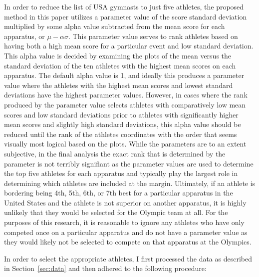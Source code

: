 \documentclass[12pt]{article}
\begin{document}
In order to reduce the list of USA gymnasts to just five athletes, the proposed method in 
this paper utilizes a parameter value of the score standard deviation multiplied by some alpha value subtracted 
from the mean score for each apparatus, or $\mu - \alpha \sigma$. This parameter value serves to rank athletes based 
on having both a high mean score for a particular event and low standard deviation. 
This alpha value is decided by examining the plots of the mean versus the standard deviation of the ten athletes 
with the highest mean scores on each apparatus. The default alpha value is 1, and ideally this produces a parameter 
value where the athletes with the highest mean scores and lowest standard deviations have the highest parameter values. 
However, in cases where the rank produced by the parameter value selects athletes with comparatively low mean scores and 
low standard deviations prior to athletes with significantly higher mean scores and slightly high standard deviations, 
this alpha value should be reduced until the rank of the athletes coordinates with the order that seems visually most 
logical based on the plots. While the parameters are to an extent subjective, in the final analysis the exact rank that 
is determined by the parameter is not terribly signifiant as the parameter values are used to determine the top five 
athletes for each apparatus and typically play the largest role in determining which athletes are included at the margin. 
Ultimately, if an athlete is bordering being 4th, 5th, 6th, or 7th best for a particular apparatus in the United States 
and the athlete is not superior on another apparatus, it is highly unlikely that they would be selected for the Olympic 
team at all. For the purposes of this research, it is reasonable to ignore any athletes who have only competed once 
on a particular apparatus and do not have a parameter value as they would 
likely not be selected to compete on that apparatus at the Olympics.

In order to select the appropriate athletes, I first processed the data as described in Section~\ref{sec:data} 
and then adhered to the following procedure:
\end{document}
